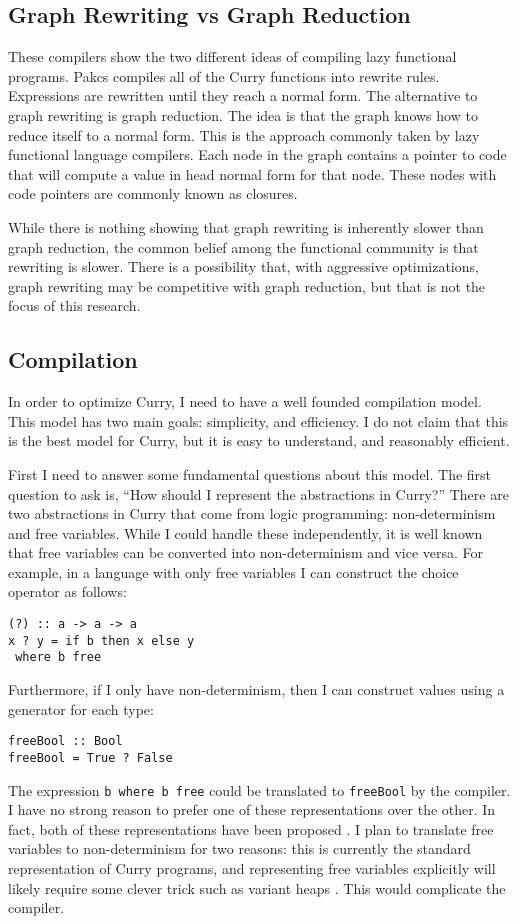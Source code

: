 \subsection{Graph Rewriting vs Graph Reduction}
These compilers show the two different ideas of compiling lazy functional programs.
Pakcs compiles all of the Curry functions into rewrite rules.
Expressions are rewritten until they reach a normal form.
The alternative to graph rewriting is graph reduction.
The idea is that the graph knows how to reduce itself to a normal form.
This is the approach commonly taken by lazy functional language compilers.
Each node in the graph contains a pointer to code that will compute a value in head normal form for that node.
These nodes with code pointers are commonly known as closures.

While there is nothing showing that graph rewriting is inherently slower than graph reduction,
the common belief among the functional community is that rewriting is slower.
There is a possibility that, with aggressive optimizations, graph rewriting may be competitive with graph reduction,
but that is not the focus of this research.

\subsection{Compilation}
In order to optimize Curry, I need to have a well founded compilation model.
This model has two main goals: simplicity, and efficiency.
I do not claim that this is the best model for Curry,
but it is easy to understand, and reasonably efficient.

First I need to answer some fundamental questions about this model.
The first question to ask is, ``How should I represent the abstractions in Curry?''
There are two abstractions in Curry that come from logic programming:
non-determinism and free variables.
While I could handle these independently, it is well known that free variables can be converted into
non-determinism and vice versa.
For example, in a language with only free variables I can construct the choice operator as follows:
\begin{verbatim}
(?) :: a -> a -> a
x ? y = if b then x else y
 where b free
\end{verbatim}
Furthermore, if I only have non-determinism,
then I can construct values using a generator for each type:
\begin{verbatim}
freeBool :: Bool
freeBool = True ? False
\end{verbatim}
The expression \texttt{b where b free} could be translated to \texttt{freeBool} by the compiler.
I have no strong reason to prefer one of these representations over the other.
In fact, both of these representations have been proposed \cite{curry_vm, Brassel2011PHD}.
I plan to translate free variables to non-determinism for two reasons:
this is currently the standard representation of Curry programs,
and representing free variables explicitly
will likely require some clever trick such as variant heaps \cite{curry_vm}.
This would complicate the compiler.

